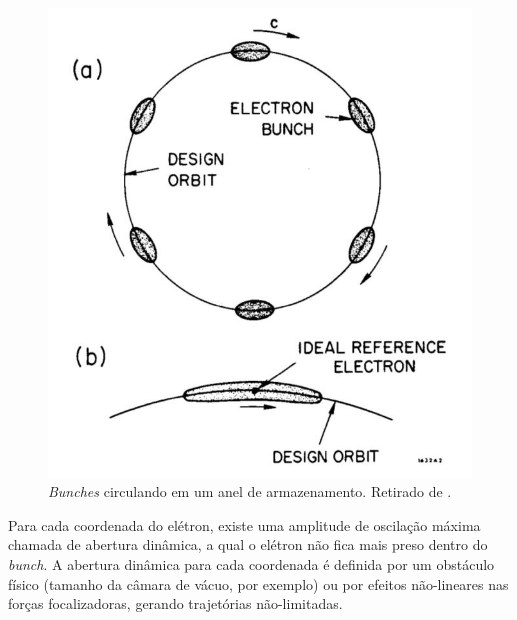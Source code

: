 \begin{figure}[!htb]
	\centering
	\includegraphics[width=0.55\linewidth]{./Figuras/fig2.jpeg}
	\caption{\textit{Bunches} circulando em um anel de armazenamento. Retirado de \cite{sands1970physics}.}
	\label{fig:fig2}
\end{figure}
	
Para cada coordenada do elétron, existe uma amplitude de oscilação máxima chamada de abertura dinâmica, a qual o elétron não fica mais preso dentro do \textit{bunch}. A abertura dinâmica para cada coordenada é definida por um obstáculo físico (tamanho da câmara de vácuo, por exemplo) ou por efeitos não-lineares nas forças focalizadoras, gerando trajetórias não-limitadas.